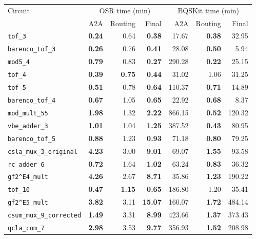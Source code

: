 \begin{table}[p]
\centering
\scriptsize
\begin{tabular}{l|rrr|rrr}
\hline
Circuit & \multicolumn{3}{c|}{OSR time (min)} & \multicolumn{3}{c}{BQSKit time (min)} \\
 & A2A & Routing & Final & A2A & Routing & Final \\
\hline
\texttt{tof\_3} & \textbf{0.24} & 0.64 & \textbf{0.38} & 17.67 & \textbf{0.38} & 32.95 \\
\texttt{barenco\_tof\_3} & \textbf{0.26} & 0.76 & \textbf{0.41} & 28.08 & \textbf{0.50} & 5.94 \\
\texttt{mod5\_4} & \textbf{0.79} & 0.83 & \textbf{0.27} & 290.28 & \textbf{0.22} & 25.15 \\
\texttt{tof\_4} & \textbf{0.39} & \textbf{0.75} & \textbf{0.44} & 31.02 & 1.06 & 31.25 \\
\texttt{tof\_5} & \textbf{0.51} & 0.78 & \textbf{0.64} & 110.37 & \textbf{0.71} & 14.89 \\
\texttt{barenco\_tof\_4} & \textbf{0.67} & 1.05 & \textbf{0.65} & 22.92 & \textbf{0.68} & 8.37 \\
\texttt{mod\_mult\_55} & \textbf{1.98} & 1.32 & \textbf{2.22} & 866.15 & \textbf{0.52} & 120.32 \\
\texttt{vbe\_adder\_3} & \textbf{1.01} & 1.04 & \textbf{1.25} & 387.52 & \textbf{0.43} & 80.95 \\
\texttt{barenco\_tof\_5} & \textbf{0.88} & 1.23 & \textbf{0.93} & 71.18 & \textbf{0.80} & 79.25 \\
\texttt{csla\_mux\_3\_original} & \textbf{4.23} & 3.00 & \textbf{9.01} & 69.07 & \textbf{1.55} & 93.58 \\
\texttt{rc\_adder\_6} & \textbf{0.72} & 1.64 & \textbf{1.02} & 63.24 & \textbf{0.83} & 36.32 \\
\texttt{gf2\textasciicircum{}E4\_mult} & \textbf{4.26} & 2.67 & \textbf{8.71} & 35.86 & \textbf{1.23} & 190.22 \\
\texttt{tof\_10} & \textbf{0.47} & \textbf{1.15} & \textbf{0.65} & 186.80 & 1.20 & 35.41 \\
\texttt{gf2\textasciicircum{}E5\_mult} & \textbf{3.82} & 3.11 & \textbf{15.07} & 160.07 & \textbf{1.72} & 484.14 \\
\texttt{csum\_mux\_9\_corrected} & \textbf{1.49} & 3.31 & \textbf{8.99} & 423.66 & \textbf{1.37} & 373.43 \\
\texttt{qcla\_com\_7} & \textbf{2.98} & 3.53 & \textbf{9.77} & 356.93 & \textbf{1.52} & 208.98 \\

\end{tabular}
\end{table}
